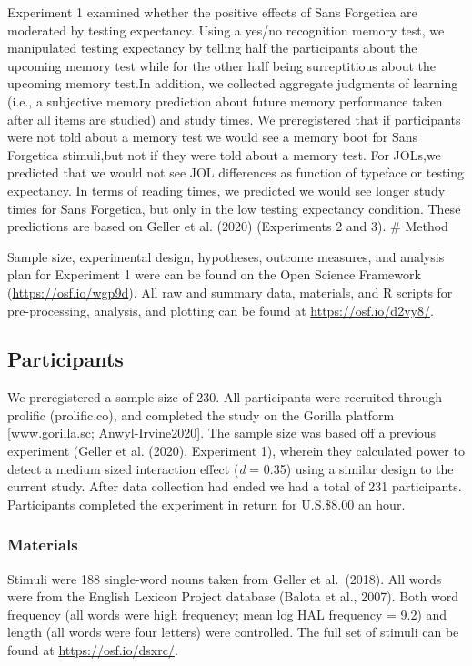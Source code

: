 \documentclass[
  english,
  jou]{apa6}
\begin{document}
Experiment 1 examined whether the positive effects of Sans Forgetica are moderated by testing expectancy. Using a yes/no recognition memory test, we manipulated testing expectancy by telling half the participants about the upcoming memory test while for the other half being surreptitious about the upcoming memory test.In addition, we collected aggregate judgments of learning (i.e., a subjective memory prediction about future memory performance taken after all items are studied) and study times. We preregistered that if participants were not told about a memory test we would see a memory boot for Sans Forgetica stimuli,but not if they were told about a memory test. For JOLs,we predicted that we would not see JOL differences as function of typeface or testing expectancy. In terms of reading times, we predicted we would see longer study times for Sans Forgetica, but only in the low testing expectancy condition. These predictions are based on Geller et al. (2020) (Experiments 2 and 3).
\# Method

Sample size, experimental design, hypotheses, outcome measures, and analysis plan for Experiment 1 were can be found on the Open Science Framework (\url{https://osf.io/wgp9d}). All raw and summary data, materials, and R scripts for pre-processing, analysis, and plotting can be found at \url{https://osf.io/d2vy8/}.

\hypertarget{participants}{%
\subsection{Participants}\label{participants}}

We preregistered a sample size of 230. All participants were recruited through prolific (prolific.co), and completed the study on the Gorilla platform {[}www.gorilla.sc; Anwyl-Irvine2020{]}. The sample size was based off a previous experiment (Geller et al. (2020), Experiment 1), wherein they calculated power to detect a medium sized interaction effect (\emph{d} = 0.35) using a similar design to the current study. After data collection had ended we had a total of 231 participants. Participants completed the experiment in return for U.S.\$8.00 an hour.

\hypertarget{materials}{%
\subsubsection{Materials}\label{materials}}

Stimuli were 188 single-word nouns taken from Geller et al.~(2018). All words were from the English Lexicon Project database (Balota et al., 2007). Both word frequency (all words were high frequency; mean log HAL frequency = 9.2) and length (all words were four letters) were controlled. The full set of stimuli can be found at \url{https://osf.io/dsxrc/}.
\end{document}
